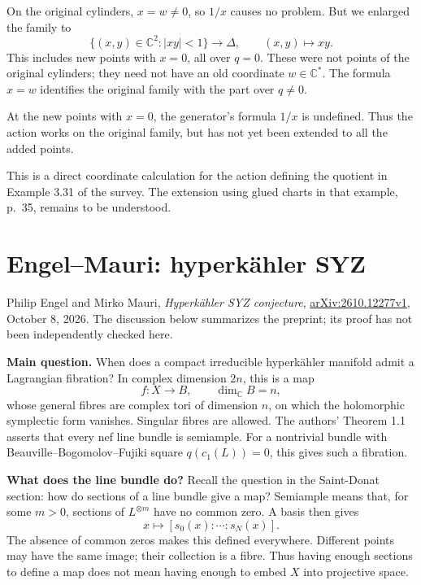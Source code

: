On the original cylinders, $x=w\ne0$,
so $1/x$ causes no problem. But we
enlarged the family to
$$
\{(x,y)\in\mathbb{C}^2:|xy|<1\}
\longrightarrow\Delta,\qquad
(x,y)\longmapsto xy.
$$
This includes new points with $x=0$,
all over $q=0$. These were not points
of the original cylinders; they need
not have an old coordinate
$w\in\mathbb{C}^*$. The formula $x=w$
identifies the original family with
the part over $q\ne0$.

At the new points with $x=0$, the
generator's formula $1/x$ is undefined.
Thus the action works on the original
family, but has not yet been extended
to all the added points.

This is a direct coordinate calculation
for the action defining the quotient in
Example 3.31 of the survey. The extension
using glued charts in that example,
p.~35, remains to be understood.


\section{Engel--Mauri: hyperk\"ahler SYZ}
\label{section-engel-mauri-syz}

\noindent
Philip Engel and Mirko Mauri,
\emph{Hyperk\"ahler SYZ conjecture},
\href{https://arxiv.org/html/2610.12277v1}
{arXiv:2610.12277v1}, October 8, 2026.
The discussion below summarizes the
preprint; its proof has not been
independently checked here.

\medskip\noindent
{\bf Main question.}
When does a compact irreducible
hyperk\"ahler manifold admit a
Lagrangian fibration? In complex
dimension $2n$, this is a map
$$
f:X\longrightarrow B,
\qquad \dim_{\mathbb{C}}B=n,
$$
whose general fibres are complex tori
of dimension $n$, on which the
holomorphic symplectic form vanishes.
Singular fibres are allowed.
The authors' Theorem 1.1 asserts that
every nef line bundle is semiample.
For a nontrivial bundle with
Beauville--Bogomolov--Fujiki square
$q(c_1(L))=0$, this gives such a
fibration.

\medskip\noindent
{\bf What does the line bundle do?}
Recall the question in the Saint-Donat
section: how do sections of a line
bundle give a map?
Semiample means that, for some $m>0$,
sections of $L^{\otimes m}$ have no
common zero. A basis then gives
$$
x\longmapsto[s_0(x):\cdots:s_N(x)].
$$
The absence of common zeros makes this
defined everywhere.
Different points may have the same
image; their collection is a fibre.
Thus having enough sections to define
a map does not mean having enough to
embed $X$ into projective space.

